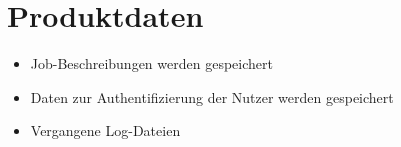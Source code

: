 \section{Produktdaten}
\begin{itemize}
    \item Job-Beschreibungen werden gespeichert
    \item Daten zur Authentifizierung der Nutzer werden gespeichert 
    \item Vergangene Log-Dateien
\end{itemize}